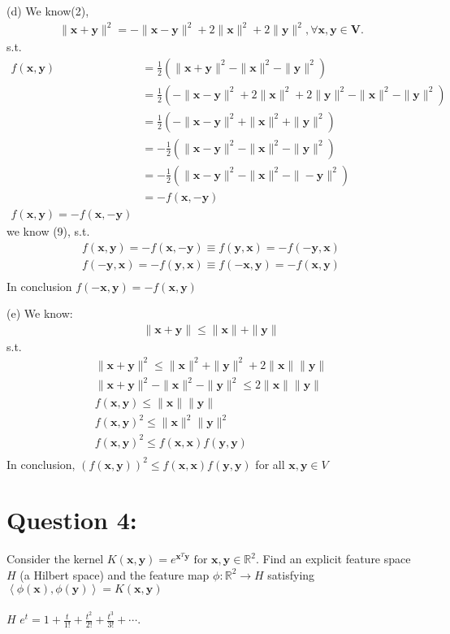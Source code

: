 \documentclass[a4paper,12pt]{article}
\newcommand{\R}{\mathbb{R}}
\begin{document}
(d)
We know(2),
\begin{align*}
    \|\bm{x} + \bm{y}\|^2 = - \|\bm{x} - \bm{y}\|^2 + 2\|\bm{x}\|^2 + 2\|\bm{y}\|^2, \forall \bm{x}, \bm{y} \in \bm{V}.
\end{align*}
s.t.
\begin{align*}
    f(\bm{x}, \bm{y}) &= \frac 1 2 (\|\bm{x} + \bm{y}\|^2 - \|\bm{x}\|^2 - \|\bm{y}\|^2) \\
    &= \frac 1 2 (- \|\bm{x} - \bm{y}\|^2 + 2\|\bm{x}\|^2 + 2\|\bm{y}\|^2 - \|\bm{x}\|^2 - \|\bm{y}\|^2 )  \\
    &= \frac 1 2 (- \|\bm{x} - \bm{y}\|^2 + \|\bm{x}\|^2 + \|\bm{y}\|^2)  \\
    &= -\frac 1 2 (\|\bm{x} - \bm{y}\|^2 - \|\bm{x}\|^2 - \|\bm{y}\|^2)  \\
    &= -\frac 1 2 (\|\bm{x} - \bm{y}\|^2 - \|\bm{x}\|^2 - \|-\bm{y}\|^2)  \\
    &= -f(\bm{x}, -\bm{y}) \\
    f(\bm{x}, \bm{y}) = -f(\bm{x}, -\bm{y})
\end{align*}
we know (9), s.t.
\begin{align*}
    f(\bm{x}, \bm{y}) = -f(\bm{x}, -\bm{y}) \equiv f(\bm{y}, \bm{x}) = -f(-\bm{y}, \bm{x})\\
    f(-\bm{y}, \bm{x}) = -f(\bm{y}, \bm{x}) \equiv f(-\bm{x}, \bm{y}) = -f(\bm{x}, \bm{y}) \\
\end{align*}
In conclusion \(f(-\bm{x}, \bm{y}) = -f(\bm{x}, \bm{y})\)

(e)
We know:
\begin{align*}
    \|\bm{x} + \bm{y}\| \leq \|\bm{x}\| + \|\bm{y}\|
\end{align*}
s.t.
\begin{align*}
    \|\bm{x} + \bm{y}\|^2 \leq \|\bm{x}\|^2 + \|\bm{y}\|^2 + 2\|\bm{x}\|\|\bm{y}\| \\
    \|\bm{x} + \bm{y}\|^2 - \|\bm{x}\|^2 - \|\bm{y}\|^2 \leq 2\|\bm{x}\|\|\bm{y}\| \\
    f(\bm{x}, \bm{y}) \leq \|\bm{x}\|\|\bm{y}\| \\
    f(\bm{x}, \bm{y})^2 \leq \|\bm{x}\|^2\|\bm{y}\|^2 \\
    f(\bm{x}, \bm{y})^2 \leq f(\bm{x}, \bm{x})f(\bm{y}, \bm{y}) \\
\end{align*}
In conclusion, \((f(\bm{x}, \bm{y}))^2 \leq f(\bm{x}, \bm{x})f(\bm{y}, \bm{y})\) for all \(\bm{x}, \bm{y} \in V\)

\section*{Question 4:}
Consider the kernel \(K(\bm{x}, \bm{y}) = e^{\bm{x}^T\bm{y}} \text{ for } \bm{x}, \bm{y} \in \R^2\). 
Find an explicit feature space \(H\) (a Hilbert space)  
and the feature map \(\phi : \R^2 \to H\)  
satisfying \(\left< \phi(\bm{x}), \phi(\bm{y})\right> = K(\bm{x}, \bm{y}) \) \\ 
 \\
\(H\)  
\(e^t = 1 + \frac{t}{1!} + \frac{t^2}{2!} + \frac{t^3}{3!} + \cdots.\)
\end{document}
